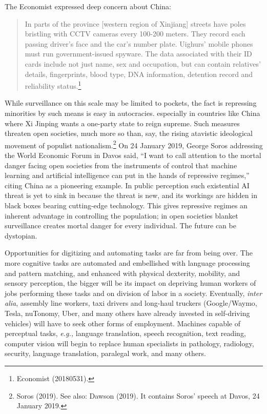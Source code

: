 \begin{multicols}{2}
The Economist expressed deep concern about China:
\begin{quote}
In parts of the province [western region of Xinjiang] streets have poles bristling with CCTV cameras every 100-200 meters. They record each passing driver's face and the car's number plate. Uighurs’ mobile phones must run government-issued spyware. The data associated with their ID cards include not just name, sex and occupation, but can contain relatives’ details, fingerprints, blood type, DNA information, detention record and reliability status.\footnote{Economist (20180531).}
\end{quote}

While surveillance on this scale may be limited to pockets, the fact is repressing minorities by such means is easy in autocracies. especially in countries like China where Xi Jinping wants a one-party state to reign supreme. Such measures threaten open societies, much more so than, say, the rising atavistic ideological movement of populist nationalism.\footnote{Soros (2019). See also: Dawson (2019). It contains Soros' speech at Davos, 24 January 2019.} On 24 January 2019, George Soros addressing the World Economic Forum in Davos said, ``I want to call attention to the mortal danger facing open societies from the instruments of control that machine learning and artificial intelligence can put in the hands of repressive regimes,'' citing China as a pioneering example. In public perception such existential AI threat is yet to sink in because the threat is new, and its workings are hidden in black boxes bearing cutting-edge technology. This gives repressive regimes an inherent advantage in controlling the population; in open societies blanket surveillance creates mortal danger for every individual. The future can be dystopian.

Opportunities for digitizing and automating tasks are far from being over. The more cognitive tasks are automated and embellished with language processing and pattern matching, and enhanced with physical dexterity, mobility, and sensory perception, the bigger will be its impact on depriving human workers of jobs performing these tasks and on division of labor in a society. Eventually, \textit{inter alia}, assembly line workers, taxi drivers and long-haul truckers (Google/Waymo, Tesla, nuTonomy, Uber, and many others have already invested in self-driving vehicles) will have to seek other forms of employment. Machines capable of perceptual tasks, \textit{e.g.,} language translation, speech recognition, text reading, computer vision will begin to replace human specialists in pathology, radiology, security, language translation, paralegal work, and many others.


\end{multicols}

